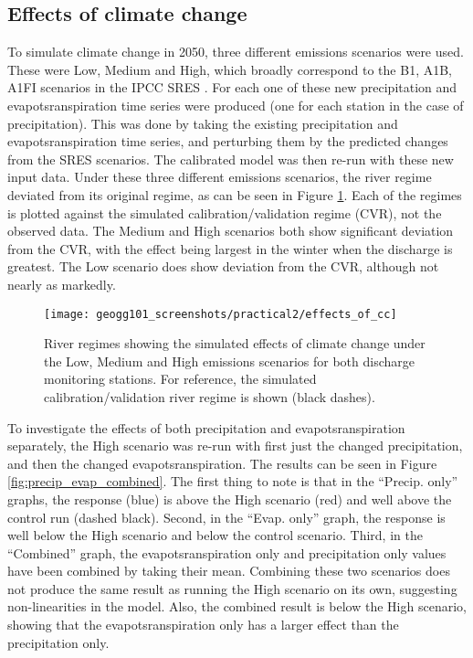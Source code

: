 \documentclass{article}
\begin{document}
\newpage

\subsection{Effects of climate change}

To simulate climate change in 2050, three different emissions scenarios were used. These were Low, Medium and High, which broadly correspond to the B1, A1B, A1FI scenarios in the IPCC SRES \parencite{ipcc2000special}. For each one of these new precipitation and evapotsranspiration time series were produced (one for each station in the case of precipitation). This was done by taking the existing precipitation and evapotsranspiration time series, and perturbing them by the predicted changes from the SRES scenarios. The calibrated model was then re-run with these new input data. Under these three different emissions scenarios, the river regime deviated from its original regime, as can be seen in Figure \ref{fig:effects_of_cc}. Each of the regimes is plotted against the simulated calibration/validation regime (CVR), not the observed data. The Medium and High scenarios both show significant deviation from the CVR, with the effect being largest in the winter when the discharge is greatest. The Low scenario does show deviation from the CVR, although not nearly as markedly.

\begin{figure}[!h]
    \centering
    \texttt{[image: geogg101\_screenshots/practical2/effects\_of\_cc]}
    \caption{River regimes showing the simulated effects of climate change under the Low, Medium and High emissions scenarios for both discharge monitoring stations. For reference, the simulated calibration/validation river regime is shown (black dashes). }
    \label{fig:effects_of_cc}
\end{figure}

To investigate the effects of both precipitation and evapotsranspiration separately, the High scenario was re-run with first just the changed precipitation, and then the changed evapotsranspiration. The results can be seen in Figure \ref{fig:precip_evap_combined}. The first thing to note is that in the ``Precip. only'' graphs, the response (blue) is above the High scenario (red) and well above the control run (dashed black). Second, in the ``Evap. only'' graph, the response is well below the High scenario and below the control scenario. Third, in the ``Combined'' graph, the evapotsranspiration only and precipitation only values have been combined by taking their mean. Combining these two scenarios does not produce the same result as running the High scenario on its own, suggesting non-linearities in the model. Also, the combined result is below the High scenario, showing that the evapotsranspiration only has a larger effect than the precipitation only.
\end{document}
